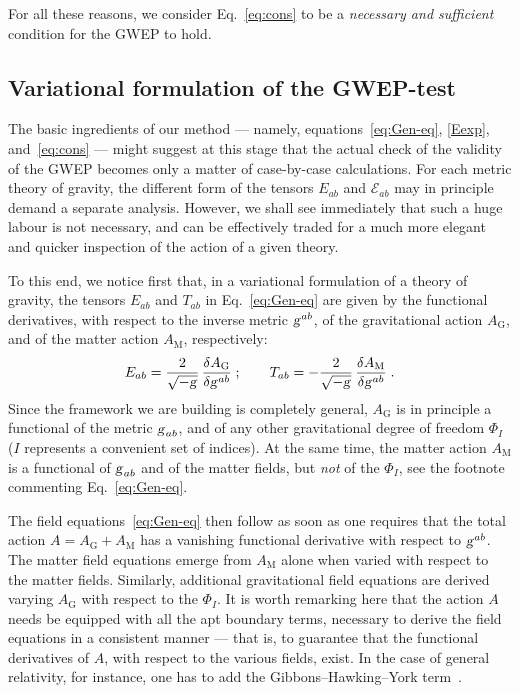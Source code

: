 \documentclass[a4paper,showkeys,aps,prd,reprint,nofootinbib,showpacs,twocolumn]{revtex4-1}
\newcommand{\eq}[1]{\( #1 \)}
\newcommand{\eqd}[1]{\begin{equation} #1 \end{equation}}
\newcommand{\Cal}[1]{\mathcal{#1}}
\newcommand{\matg}{\text{\textsl{g}}}%
\theoremstyle{plain}
\begin{document}
For all these reasons, we consider Eq.~\eqref{eq:cons} to be a \emph{necessary and sufficient} condition for the GWEP to hold.

\subsection{Variational formulation of the GWEP-test}
\label{Ss:var}

The basic ingredients of our method --- namely, equations~\eqref{eq:Gen-eq}, \eqref{Eexp}, and~\eqref{eq:cons} --- might suggest at this stage that the actual check of the validity of the GWEP becomes only a matter of case-by-case calculations. For each metric theory of gravity,  the different form of the tensors \eq{E_{ab}} and \eq{\Cal{E}_{ab}} may in principle demand a separate analysis. However, we shall see immediately that such a huge labour is not necessary, and can be effectively traded for a much more elegant and quicker inspection of the action of a given theory.

To this end, we notice first that, in a variational formulation of a theory of gravity, the tensors \eq{E_{ab}} and \eq{T_{ab}} in Eq.~\eqref{eq:Gen-eq} are given by the functional derivatives, with respect to the inverse metric \eq{\matg^{ab}}, of the gravitational action \eq{A_{\text{G}}}, and of the matter action \eq{A_{\text{M}}}, respectively:
%
\eqd{E_{ab} = \frac{2}{\sqrt{-\matg}} \, \frac{\delta A_{\text{G}}}{\delta \matg^{ab}}\;; \quad  \quad T_{ab} = - \frac{2}{\sqrt{-\matg}} \, \frac{\delta A_{\text{M}}}{\delta \matg^{ab}} \;.}
%
Since the framework we are building is completely general, \eq{A_{\text{G}}} is in principle a functional of the metric \eq{\matg_{ab}}, and of any other gravitational degree of freedom \eq{\Phi_I} (\eq{I} represents a convenient set of indices).  At the same time, the matter action \eq{A_{\text{M}}} is a functional of \eq{\matg_{ab}} and of the matter fields, but \emph{not} of the \eq{\Phi_I}, see the footnote commenting Eq.~\eqref{eq:Gen-eq}.

The field equations~\eqref{eq:Gen-eq} then follow as soon as one requires that the total action \eq{A = A_{\text{G}} + A_{\text{M}}} has a vanishing functional derivative with respect to \eq{\matg^{ab}}.   The matter field equations emerge from \eq{A_{\text{M}}} alone when varied with respect to the matter fields.  Similarly, additional gravitational field equations are derived varying \eq{A_{\text{G}}} with respect to the \eq{\Phi_I}. It is worth remarking here that the action \eq{A} needs be equipped with all the apt boundary terms, necessary to derive the field equations in a consistent manner --- that is, to guarantee that the functional derivatives of \eq{A}, with respect to the various fields, exist.  In the case of general relativity, for instance, one has to add the Gibbons--Hawking--York term~\cite{Gibbons:1976ue, York:1972sj}.
\end{document}
